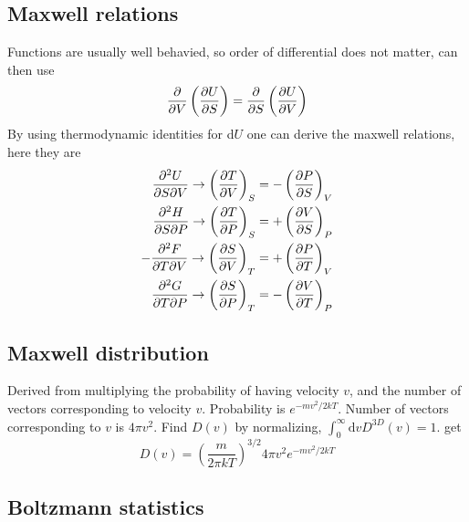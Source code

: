 \documentclass[a4paper, norsk, 8pt]{article}
\begin{document}
\begin{multicols*}{3}
\subsection*{\footnotesize  Maxwell relations}
Functions are usually well behavied, so order of differential does not matter, can then use
\begin{equation*}
    \pdv{}{V}\left( \pdv{U}{S} \right) = \pdv{}{S}\left( \pdv{U}{V} \right)
\end{equation*}
By using thermodynamic identities for d$U$ one can derive the maxwell relations, here they are
\begin{align*}
  \pdv{U}{S}{V} \rightarrow \left( \pdv{T}{V} \right)_S &= - \left( \pdv{P}{S} \right)_V \\
  \pdv{H}{S}{P} \rightarrow \left( \pdv{T}{P} \right)_S &= + \left( \pdv{V}{S} \right)_P \\
  -\pdv{F}{T}{V} \rightarrow \left( \pdv{S}{V} \right)_T &= + \left( \pdv{P}{T} \right)_V \\
  \pdv{G}{T}{P} \rightarrow \left( \pdv{S}{P} \right)_T &= - \left( \pdv{V}{T} \right)_P \\
\end{align*}

\subsection*{\footnotesize  Maxwell distribution}
Derived from multiplying the probability of having velocity $v$, and the number of vectors corresponding to velocity $v$. Probability is $e^{-mv^2/2kT}$. Number of vectors corresponding to $v$ is $4\pi v^2$. Find $D(v)$ by normalizing, $\int_{0}^{\infty}\mbox{d}v D^{3D}(v)=1$. get
\begin{equation*}
    D(v) = \left(\frac{m}{2\pi k T}\right)^{3/2}4\pi v^2 e^{-mv^2/2kT}
\end{equation*}


\subsection*{\footnotesize  Boltzmann statistics}

\end{multicols*}
\end{document}
